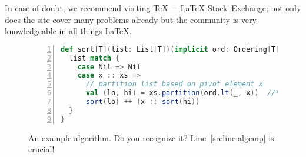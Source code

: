 \documentclass[]{tukseminar}
\begin{document}
In case of doubt, we recommend visiting \href{http://tex.stackexchange.com}{TeX~--~LaTeX Stack~Exchange}; not only does the site cover many problems already but the community is very knowledgeable in all things \LaTeX{}.

\begin{figure}
\begin{lstlisting}[language=Scala,numbers=left]
def sort[T](list: List[T])(implicit ord: Ordering[T]): List[T] = {
  list match {
    case Nil => Nil
    case x :: xs =>
      // partition list based on pivot element x
      val (lo, hi) = xs.partition(ord.lt(_, x))  //*\label{srcline:algcmp}
      sort(lo) ++ (x :: sort(hi))
  }
}
\end{lstlisting}
\caption{An example algorithm. Do you recognize it? Line~\ref{srcline:algcmp} is crucial!}
\label{alg:example}
\end{figure}
\end{document}
